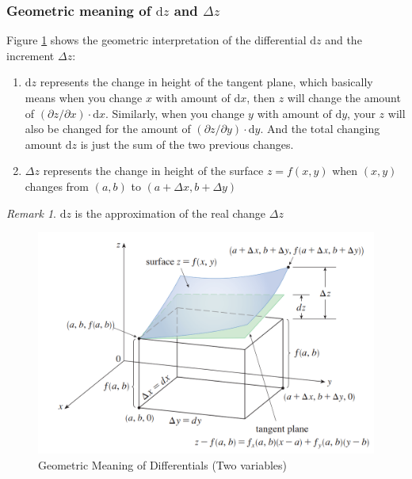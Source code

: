 \documentclass[math,code]{amznotes}
\theoremstyle{remark}
\newtheorem*{remark}{Remark}
\begin{document}
\subsubsection{Geometric meaning of $\mathrm d z$ and $\Delta z$}
Figure \ref{fig:geomertic-meaning-of-differential-two-variables} shows the geometric interpretation of the differential $\mathrm d z$ and the increment $\Delta z$:
\begin{enumerate}
    \item $\mathrm d z$  represents the change in height of the tangent plane, which basically means when you change $x$ with amount of $\mathrm d x$, then $z$ will change the amount of $(\partial z / \partial x) \cdot \mathrm d x$. Similarly, when you change $y$ with amount of $\mathrm d y$, your $z$ will also be changed for the amount of $(\partial z / \partial y) \cdot \mathrm d y$. And the total changing amount $\mathrm d z$ is just the sum of the two previous changes.
    \item $\Delta z$ represents the change in height of the surface $z=f(x,y)$ when $(x,y)$ changes from $(a,b)$ to $(a+\Delta x, b+\Delta y)$
\end{enumerate}
\begin{notebox}
    \begin{remark}
        $\mathrm d z$ is the approximation of the real change $\Delta z$
    \end{remark}
\end{notebox}
\begin{figure}[H]
    \centering
    \includegraphics[width=0.5\linewidth]{images/geomertic-meaning-of-differential-two-variables.png}
    \caption{Geometric Meaning of Differentials (Two variables)}
    \label{fig:geomertic-meaning-of-differential-two-variables}
\end{figure}
\end{document}
